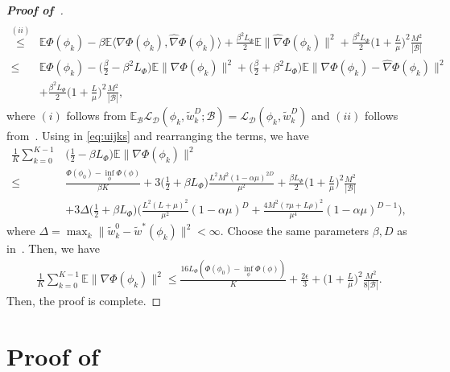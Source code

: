 \documentclass{osudissert96}
\def\gB{{\mathcal{B}}}
\def\gD{{\mathcal{D}}}
\def\gL{{\mathcal{L}}}
\begin{document}
\begin{proof}[\bf Proof of~]
{\begin{align}
\\\overset{(ii)}\leq &\mathbb{E}\Phi(\phi_k)  - \beta \mathbb{E}\big\langle \nabla \Phi(\phi_k),\widehat \nabla\Phi(\phi_k)\big\rangle +\frac{\beta^2L_\Phi}{2}\mathbb{E} \|\widehat \nabla\Phi(\phi_k)\|^2 +\frac{\beta^2L_\Phi}{2}  \Big(1+\frac{L}{\mu}\Big)^2\frac{M^2}{|\gB|}\nonumber
\\\leq &\mathbb{E}\Phi(\phi_k) -\Big(\frac{\beta}{2}-\beta^2 L_\Phi \Big)\mathbb{E}\| \nabla \Phi(\phi_k)\|^2 +\Big(\frac{\beta}{2}+\beta^2 L_\Phi\Big)\mathbb{E}\|\nabla\Phi(\phi_k)-\widehat \nabla\Phi(\phi_k)\|^2 \nonumber
\\&+\frac{\beta^2L_\Phi}{2}  \Big(1+\frac{L}{\mu}\Big)^2\frac{M^2}{|\gB|},
\end{align}}
\hspace{-0.15cm}where $(i)$ follows from $\mathbb{E}_{\gB}\gL_{\gD} (\phi_k, \widetilde w^D_k;\gB)=\gL_{\gD} (\phi_k, \widetilde w^D_k)$ and $(ii)$ follows from~. Using   in \cref{eq:uijks} and rearranging the terms, we have 
\begin{align*}
\frac{1}{K}\sum_{k=0}^{K-1}&\Big(\frac{1}{2}-\beta L_\Phi \Big)\mathbb{E}\| \nabla \Phi(\phi_k)\|^2   \nonumber
\\\leq& \frac{ \Phi(\phi_0)-\inf_\phi\Phi(\phi)}{\beta K} +3\Big(\frac{1}{2}+\beta L_\Phi\Big)\frac{L^2M^2(1-\alpha\mu)^{2D}}{\mu^2}+\frac{\beta L_\Phi}{2}  \Big(1+\frac{L}{\mu}\Big)^2\frac{M^2}{|\gB|} \nonumber
\\&+ 3\Delta\Big(\frac{1}{2}+\beta L_\Phi\Big)\Big( \frac{L^2(L+\mu)^2}{\mu^2} (1-\alpha\mu)^{D} +\frac{4M^2\left(  \tau\mu+ L\rho \right)^2}{\mu^4}(1-\alpha\mu)^{D-1} \Big),
\end{align*}
where $\Delta=\max_{k}\|\widetilde w^0_k-\widetilde w^*(\phi_k)\|^2<\infty$. Choose the same parameters $\beta,D$ as in~. Then, we have
\begin{align*}
\frac{1}{K}\sum_{k=0}^{K-1}\mathbb{E}\| \nabla \Phi(\phi_k)\|^2 \leq \frac{16 L_\Phi (\Phi(\phi_0)-\inf_\phi\Phi(\phi))}{K} + \frac{2\epsilon}{3}+ \Big(1+\frac{L}{\mu}\Big)^2\frac{M^2}{8|\gB|}.
\end{align*}
Then, the proof is complete. 
\end{proof}

\chapter{Proof of }\label{appendix:acc_bilevel}
\end{document}
